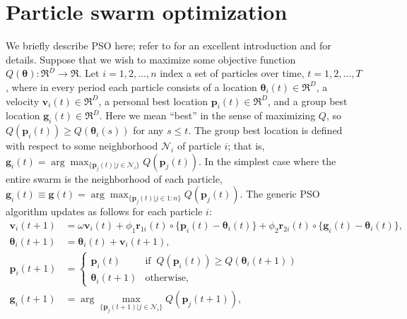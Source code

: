 \documentclass[12pt]{article}
\begin{document}
\section{Particle swarm optimization}\label{sec:pso}
We briefly describe PSO here; refer to \citet{blum2008swarm} for an excellent introduction and \citet{clerc2010particle} for details. Suppose that we wish to maximize some objective function $Q(\bm{\theta}):\Re^D\to\Re$. Let $i=1,2,\dots,n$ index a set of particles over time, $t=1,2,\dots,T$, where in every period each particle consists of a location $\bm{\theta}_i(t)\in \Re^D$, a velocity $\bm{v}_i(t) \in \Re^D$, a personal best location $\bm{p}_i(t)\in\Re^D$, and a group best location $\bm{g}_i(t)\in\Re^D$. Here we mean ``best'' in the sense of maximizing $Q$, so $Q(\bm{p}_i(t)) \geq Q(\bm{\theta}_i(s))$ for any $s\leq t$. The group best location is defined with respect to some neighborhood $\mathcal{N}_i$ of particle $i$; that is, $\bm{g}_i(t) = \arg\max_{\{\bm{p}_j(t)|j\in\mathcal{N}_i\}}Q(\bm{p}_j(t))$. In the simplest case where the entire swarm is the neighborhood of each particle, $\bm{g}_i(t)\equiv \bm{g}(t) = \arg\max_{\{\bm{p}_j(t)|j\in 1:n\}}Q(\bm{p}_j(t))$. The generic PSO algorithm updates as follows for each particle $i$:
\begin{align}\label{eq:pso}
\bm{v}_i(t+1) &= \omega \bm{v}_i(t) + \phi_1 \bm{r}_{1i}(t)\circ\{\bm{p}_i(t) - \bm{\theta}_i(t)\} + \phi_2 \bm{r}_{2i}(t)\circ\{\bm{g}_i(t) - \bm{\theta}_i(t)\},\nonumber\\
\bm{\theta}_i(t+1) &= \bm{\theta}_i(t) + \bm{v}_i(t+1),\nonumber\\
\bm{p}_i(t+1) &= \begin{cases} \bm{p}_i(t)   & \mbox{if }\  Q(\bm{p}_i(t)) \ge Q(\bm{\theta}_i(t + 1))\\
                               \bm{\theta}_i(t+1) & \mbox{otherwise},
\end{cases}\nonumber\\
\bm{g}_i(t+1) &= \arg\max_{\{\bm{p}_j(t+1)|j\in\mathcal{N}_i\}}Q(\bm{p}_j(t+1)),
\end{align}
\end{document}
